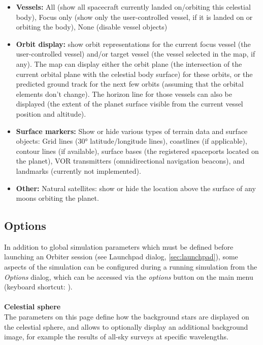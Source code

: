 \documentclass[Orbiter User Manual.tex]{subfiles}
\begin{document}
\begin{itemize}
\item \textbf{Vessels:} All (show all spacecraft currently landed on/orbiting this celestial body), Focus only (show only the user-controlled vessel, if it is landed on or orbiting the body), None (disable vessel objects)
\item \textbf{Orbit display:} show orbit representations for the current focus vessel (the user-controlled vessel) and/or target vessel (the vessel selected in the map, if any). The map can display either the orbit plane (the intersection of the current orbital plane with the celestial body surface) for these orbits, or the predicted ground track for the next few orbits (assuming that the orbital elements don’t change). The horizon line for those vessels can also be displayed (the extent of the planet surface visible from the current vessel position and altitude).
\item \textbf{Surface markers:} Show or hide various types of terrain data and surface objects: Grid lines (30° latitude/longitude lines), coastlines (if applicable), contour lines (if available), surface bases (the registered spaceports located on the planet), VOR transmitters (omnidirectional navigation beacons), and landmarks (currently not implemented).
\item \textbf{Other:} Natural satellites: show or hide the location above the surface of any moons orbiting the planet.
\end{itemize}


\subsection{Options}
\label{ssec:menu_options}
In addition to global simulation parameters which must be defined before launching an Orbiter session (see Launchpad dialog, \ref{sec:launchpad}), some aspects of the simulation can be configured during a running simulation from the \textit{Options} dialog, which can be accessed via the \textit{options} button on the main menu (keyboard shortcut: ).\\
\\
\textbf{Celestial sphere}\\
The parameters on this page define how the background stars are displayed on the celestial sphere, and allows to optionally display an additional background image, for example the results of all-sky surveys at specific wavelengths.

\begin{figure}[H]
	\centering
\end{figure}
\end{document}
